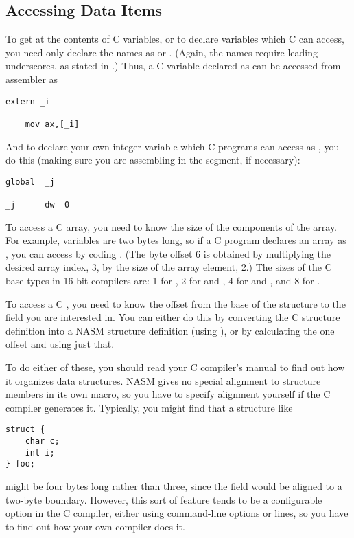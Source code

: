 \subsection{Accessing Data Items}
\label{sebsec:16cdata}

To get at the contents of C variables, or to declare variables which
C can access, you need only declare the names as  or
. (Again, the names require leading underscores, as stated
in .) Thus, a C variable declared as 
can be accessed from assembler as

\begin{lstlisting}
extern _i

    mov ax,[_i]
\end{lstlisting}

And to declare your own integer variable which C programs can access
as , you do this (making sure you are assembling in
the  segment, if necessary):

\begin{lstlisting}
global  _j

_j      dw  0
\end{lstlisting}

To access a C array, you need to know the size of the components of
the array. For example,  variables are two bytes long, so if
a C program declares an array as , you can access
 by coding . (The byte offset 6 is obtained
by multiplying the desired array index, 3, by the size of the array
element, 2.) The sizes of the C base types in 16-bit compilers are:
1 for , 2 for  and , 4 for 
and , and 8 for .

To access a C , you need to know the offset from
the base of the structure to the field you are interested in. You
can either do this by converting the C structure definition into a
NASM structure definition (using ), or by calculating the
one offset and using just that.

To do either of these, you should read your C compiler's manual to
find out how it organizes data structures. NASM gives no special
alignment to structure members in its own  macro, so you
have to specify alignment yourself if the C compiler generates it.
Typically, you might find that a structure like

\begin{lstlisting}
struct {
    char c;
    int i;
} foo;
\end{lstlisting}

might be four bytes long rather than three, since the  field
would be aligned to a two-byte boundary. However, this sort of
feature tends to be a configurable option in the C compiler, either
using command-line options or  lines, so you have to find
out how your own compiler does it.
